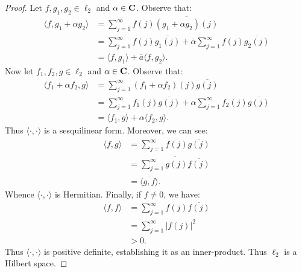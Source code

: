 \documentclass[11pt,twoside,openany]{memoir}
\begin{document}
\begin{proof}
            Let $f,g_1,g_2 \in \ell_2$ and $\alpha \in \mathbf{C}$. Observe that:
                \begin{equation*}
                \begin{split}
                    \langle f, g_1 + \alpha g_2 \rangle
                    & = \sum_{j=1}^\infty f(j) \overline{(g_1 + \alpha g_2)(j)} \\
                    & = \sum_{j = 1}^\infty f(j)\overline{g_1(j)} + \overline{\alpha}\sum_{j = 1}^\infty f(j)\overline{g_2(j)} \\
                    & = \langle f,g_1 \rangle + \overline{a}\langle f,g_2 \rangle.
                \end{split}
                \end{equation*}
            Now let $f_1,f_2,g \in \ell_2$ and $\alpha \in \mathbf{C}$. Observe that:
                \begin{equation*}
                \begin{split}
                    \langle f_1 + \alpha f_2,g \rangle
                    & = \sum_{j = 1}^\infty (f_1 + \alpha f_2)(j)\overline{g(j)} \\
                    & = \sum_{j = 1}^\infty f_1(j)\overline{g(j)} + \alpha \sum_{j = 1}^\infty f_2(j)\overline{g(j)} \\
                    & = \langle f_1,g \rangle + \alpha \langle f_2,g \rangle.
                \end{split}
                \end{equation*}
            Thus $\langle \cdot,\cdot \rangle$ is a sesquilinear form. Moreover, we can see:
                \begin{equation*}
                \begin{split}
                    \langle f,g \rangle
                    & = \sum_{j = 1}^\infty f(j)\overline{g(j)} \\
                    & = \overline{\sum_{j = 1}^\infty g(j)\overline{f(j)}} \\
                    & = \overline{\langle g,f \rangle}.
                \end{split}
                \end{equation*}
            Whence $\langle \cdot,\cdot \rangle$ is Hermitian. Finally, if $f \neq 0$, we have:
                \begin{equation*}
                \begin{split}
                    \langle f,f \rangle 
                    & = \sum_{j = 1}^\infty f(j)\overline{f(j)} \\
                    & = \sum_{j = 1}^\infty |f(j)|^2 \\
                    & > 0.
                \end{split}
                \end{equation*}
            Thus $\langle \cdot,\cdot \rangle$ is positive definite, establishing it as an inner-product. Thus $\ell_2$ is a Hilbert space.
        \end{proof}
\end{document}
